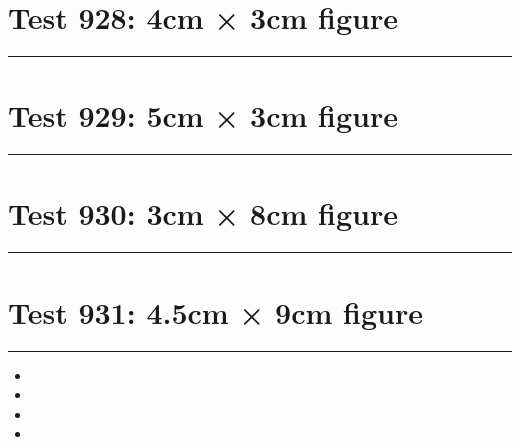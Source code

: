 \documentclass[a4paper,11pt]{article}
\begin{document}
\section*{Test 928: 4cm × 3cm figure}
\begin{swarmwrap}%
  \begin{minipage}[t]{4cm}
    \centering
    \rule{\linewidth}{3cm}
  \end{minipage}%
\end{swarmwrap}%
\swarmwrapnext
\lipsum[146]
\lipsum[147]
\lipsum[148]
\section*{Test 929: 5cm × 3cm figure}
\begin{swarmwrap}%
  \begin{minipage}[t]{5cm}
    \centering
    \rule{\linewidth}{3cm}
  \end{minipage}%
\end{swarmwrap}%
\swarmwrapnext
\lipsum[139]
\lipsum[140]
\lipsum[141]
\lipsum[142]
\lipsum[143]
\section*{Test 930: 3cm × 8cm figure}
\begin{swarmwrap}%
  \begin{minipage}[t]{3cm}
    \centering
    \rule{\linewidth}{8cm}
  \end{minipage}%
\end{swarmwrap}%
\swarmwrapnext
\lipsum[100]
\lipsum[101]
\lipsum[102]
\lipsum[103]
\lipsum[104]
\section*{Test 931: 4.5cm × 9cm figure}
\begin{swarmwrap}%
  \begin{minipage}[t]{4cm}
    \centering
    \rule{\linewidth}{9cm}
  \end{minipage}%
\end{swarmwrap}
\begin{itemize}
  \item \swarmwrapnext\lipsum[10][1-4]
  \item \lipsum[12][1-3]
  \item \lipsum[13][1-3]
  \item \lipsum[14][1-3]
\end{itemize}
\end{document}
